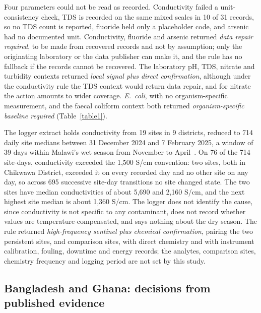 \documentclass[10pt,letterpaper]{article}
\begin{document}
Four parameters could not be read as recorded. Conductivity failed a unit-consistency check, TDS is recorded on the same mixed scales in 10 of 31 records, so no TDS count is reported, fluoride held only a placeholder code, and arsenic had no documented unit. Conductivity, fluoride and arsenic returned \textit{data repair required}, to be made from recovered records and not by assumption; only the originating laboratory or the data publisher can make it, and the rule has no fallback if the records cannot be recovered. The laboratory pH, TDS, nitrate and turbidity contexts returned \textit{local signal plus direct confirmation}, although under the conductivity rule the TDS context would return data repair, and for nitrate the action amounts to wider coverage. \textit{E.~coli}, with no organism-specific measurement, and the faecal coliform context both returned \textit{organism-specific baseline required} (Table~\ref{table1}).

The logger extract holds conductivity from 19 sites in 9 districts, reduced to 714 daily site medians between 31 December 2024 and 7 February 2025, a window of 39 days within Malawi's wet season from November to April~\cite{BGS-Earthwise-Malawi}. On 76 of the 714 site-days, conductivity exceeded the 1,500 \textmu{}S/cm convention: two sites, both in Chikwawa District, exceeded it on every recorded day and no other site on any day, so across 695 successive site-day transitions no site changed state. The two sites have median conductivities of about 5,690 and 2,160 \textmu{}S/cm, and the next highest site median is about 1,360 \textmu{}S/cm. The logger does not identify the cause, since conductivity is not specific to any contaminant, does not record whether values are temperature-compensated, and says nothing about the dry season. The rule returned \textit{high-frequency sentinel plus chemical confirmation}, pairing the two persistent sites, and comparison sites, with direct chemistry and with instrument calibration, fouling, downtime and energy records; the analytes, comparison sites, chemistry frequency and logging period are not set by this study.

\subsection*{Bangladesh and Ghana: decisions from published evidence}
\end{document}
